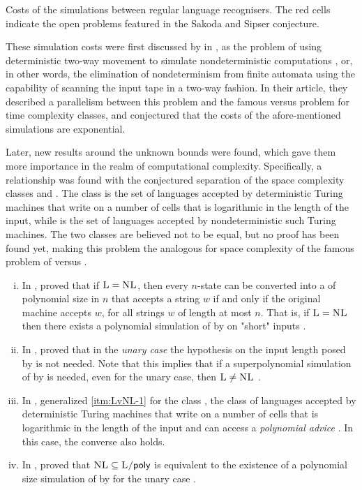 \begin{table}
	\centering
	\caption[Costs of the simulations between regular language recognisers.]{Costs of the simulations between regular language recognisers.
		The red cells indicate the open problems featured in the Sakoda and Sipser conjecture.}
	\label{tab:sims-core-general-context}
\end{table}

These simulation costs were first discussed by \citeauthor{SakSip78} in \citeyear{SakSip78}, as the problem of using deterministic two-way movement to simulate nondeterministic computations \cite{SakSip78}, or, in other words, the elimination of nondeterminism from finite automata using the capability of scanning the input tape in a two-way fashion.
In their article, they described a parallelism between this problem and the famous \cP versus \cNP problem for time complexity classes, and conjectured that the costs of the afore-mentioned simulations are exponential.

Later, new results around the unknown bounds were found, which gave them more importance in the realm of computational complexity.
Specifically, a relationship was found with the conjectured separation of the space complexity classes \cL and \cNL.
The class \cL is the set of languages accepted by deterministic Turing machines that write on a number of cells that is logarithmic in the length of the input, while \cNL is the set of languages accepted by nondeterministic such Turing machines.
The two classes are believed not to be equal, but no proof has been found yet, making this problem the analogous for space complexity of the famous problem of \cP versus \cNP.
\begin{enumerate}[(i)]
	\item\label{itm:LvNL-1} In \citeyear{BerLin77}, \citeauthor{BerLin77} proved that if $\textsc{L}=\textsc{NL}$, then every $n$-state \TNFA can be converted into a \TDFA of polynomial size in $n$ that accepts a string $w$ if and only if the original machine accepts $w$, for all strings $w$ of length at most $n$.
	      That is, if $\textsc{L}=\textsc{NL}$ then there exists a polynomial simulation of \TNFAs by \TDFAs on "short" inputs \cite{BerLin77}.
	\item In \citeyear{GefPig11}, \citeauthor{GefPig11} proved that in the \emph{unary case} the hypothesis on the input length posed by \citeauthor{BerLin77} is not needed.
	      Note that this implies that if a superpolynomial simulation of \TNFAs by \TDFAs is needed, even for the unary case, then $\textsc{L}\ne\textsc{NL}$ \cite{GefPig11}.
	\item In \citeyear{Kap14}, \citeauthor{Kap14} generalized \ref{itm:LvNL-1} for the class \cPolyL, the class of languages accepted by deterministic Turing machines that write on a number of cells that is logarithmic in the length of the input and can access a \emph{polynomial advice} \cite{Kap14,KarLip82}. In this case, the converse also holds.
	\item In \citeyear{KapPig12}, \citeauthor{KapPig12} proved that $\textsc{NL}\subseteq\textsc{L/\ensuremath{\mathsf{poly}}}$ is equivalent to the existence of a polynomial size simulation of \TNFAs by \TDFAs for the unary case \cite{KapPig15}.
\end{enumerate}


